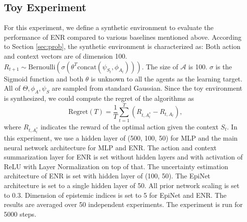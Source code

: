 

\subsection{Toy Experiment}
For this experiment, we define a synthetic environment to evaluate the performance of ENR compared to various baselines mentioned above. According to Section \ref{sec:prob}, the synthetic environment is characterized as: Both action and context vectors are of dimension 100. $R_{t+1} \sim \text{Bernoulli}\left(\sigma(\theta^T\text{concat}(\psi_{S_t}, \phi_{A_t}))\right)$. The size of $\mathcal{A}$ is 100. $\sigma$ is the Sigmoid function and both $\theta$ is unknown to all the agents as the learning target. All of $\Theta, \phi_A, \psi_S$ are sampled from standard Gaussian. Since the toy environment is synthesized, we could compute the regret of the algorithms as
\begin{equation}
    \text{Regret}(T) = \frac{1}{T}\sum_{t=1}^T (R_{t, A^*_t} - R_{t, A_t}),
\end{equation}
where $R_{t, A^*_t}$ indicates the reward of the optimal action given the context $S_t$. In this experiment, we use a hidden layer of (500, 100, 50) for MLP and the main neural network architecture for MLP and ENR. The action and context summarization layer for ENR is set without hidden layers and with activation of ReLU with Layer Normalization on top of that. The uncertainty estimation architecture of ENR is set with hidden layer of (100, 50). The EpiNet architecture is set to a single hidden layer of 50. All prior network scaling is set to 0.3. Dimension of epistemic indices is set to 5 for EpiNet and ENR. The results are averaged over 50 independent experiments. The experiment is run for 5000 steps.

